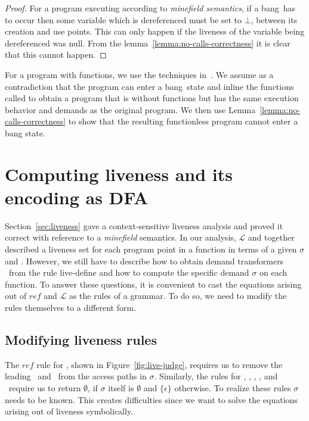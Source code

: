 \documentclass[9pt]{sigplanconf}
\newcommand{\bang}{\mbox{\sc bang}}
\begin{document}
\begin{proof}
For a program  executing according to {\em minefield  semantics}, if a
\bang\ has to  occur then some variable which is  dereferenced must be
set to  $\bot$, between its  creation and  use points.  This  can only
happen if  the liveness of  the variable being dereferenced  was null.
From  the lemma~\ref{lemma:no-calls-correctness}  it  is clear  that this  cannot
happen.
\end{proof}

For   a    program   with   functions,   we    use   the   techniques
in~\cite{asati14lgc}. We  assume as  a contradiction that  the program
can enter a \bang\ state  and inline the  functions called to  obtain a
program that is without functions  but has the same execution behavior
and    demands    as   the    original    program.     We   then    use
Lemma~\ref{lemma:no-calls-correctness}  to  show  that  the  resulting
functionless program cannot enter a bang state.


\section{Computing liveness and its encoding as DFA}\label{sec:computing}
Section~\ref{sec:liveness} gave a  context-sensitive liveness analysis
and proved it  correct with reference to a  {\em minefield} semantics.
In  our  analysis, $\mathcal{L}$  and    together described  a
liveness set for each program point in  a function in terms of a given
$\sigma$  and \Lfonly.   However, we  still  have to  describe how  to
obtain demand  transformers \Lfonly\  from the rule  {\sc live-define}
and how to compute the specific demand $\sigma$ on each function.
To  answer these  questions, it  is convenient  to cast  the equations
arising  out of  $\mathit{ref}$ and  $\mathcal{L}$ as  the rules  of a
grammar.   To do  so, we  need  to modify  the rules  themselves to  a
different form.

\subsection{Modifying liveness rules}

The      $\mathit{ref}$     rule      for     \CONS,      shown     in
Figure~\ref{fig:live-judge},  requires   us  to  remove   the  leading
\acar\ and \acdr\  from the access paths in  $\sigma$.  Similarly, the
rules for  \CAR, \CDR, \PRIM, \NULLQ,  and \SIF\ require  us to return
$\emptyset$, if  $\sigma$ itself is $\emptyset$ and
$\lbrace\epsilon\rbrace$ otherwise.  To  realize these rules
$\sigma$ needs to be known. This creates difficulties since we want to
solve the equations arising out of liveness symbolically.
\end{document}
